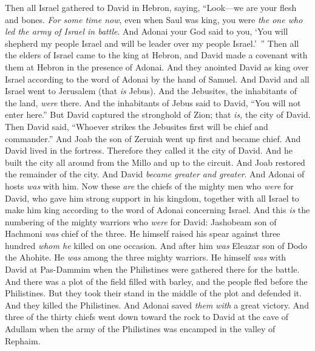 \begin{biblechapter} %
 Then all Israel gathered to David in Hebron, saying, “Look—we are your flesh and bones.
\verse \textit{For some time now}, even when Saul was king, you were \textit{the one who led the army of Israel in battle}. And Adonai your God said to you, ‘You will shepherd my people Israel and will be leader over my people Israel.’ ”
\verse Then all the elders of Israel came to the king at Hebron, and David made a covenant with them at Hebron in the presence of Adonai. And they anointed David as king over Israel according to the word of Adonai by the hand of Samuel.
\verse And David and all Israel went to Jerusalem (that \textit{is} Jebus). And the Jebusites, the inhabitants of the land, \textit{were} there.
\verse And the inhabitants of Jebus said to David, “You will not enter here.” But David captured the stronghold of Zion; that \textit{is,} the city of David.
\verse Then David said, “Whoever strikes the Jebusites first will be chief and commander.” And Joab the son of Zeruiah went up first and became chief.
\verse And David lived in the fortress. Therefore they called it the city of David.
\verse And he built the city all around from the Millo and up to the circuit. And Joab restored the remainder of the city.
\verse And David \textit{became greater and greater}. And Adonai of hosts \textit{was} with him.
 Now these \textit{are} the chiefs of the mighty men who \textit{were} for David, who gave him strong support in his kingdom, together with all Israel to make him king according to the word of Adonai concerning Israel.
\verse And this \textit{is} the numbering of the mighty warriors who \textit{were} for David: Jashobeam son of Hachmoni \textit{was} chief of the three. He himself raised his spear against three hundred \textit{whom he} killed on one occasion.
\verse And after him \textit{was} Eleazar son of Dodo the Ahohite. He \textit{was} among the three mighty warriors.
\verse He himself \textit{was} with David at Pas-Dammim when the Philistines were gathered there for the battle. And there was a plot of the field filled with barley, and the people fled before the Philistines.
\verse But they took their stand in the middle of the plot and defended it. And they killed the Philistines. And Adonai saved \textit{them} \textit{with} a great victory.
\verse And three of the thirty chiefs went down toward the rock to David at the cave of Adullam when the army of the Philistines was encamped in the valley of Rephaim.

\end{biblechapter}
